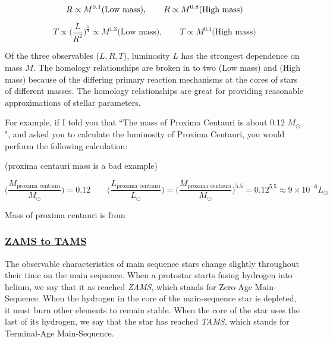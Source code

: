\documentclass[12pt]{article} %
\numberwithin{equation}{section} %
\begin{document}
\begin{equation} \label{homology_R}
R \propto M^{0.1} \text{(Low mass)}, \qquad R \propto M^{0.8} \text{(High mass)}  \\
\end{equation}

\begin{equation} \label{homology_T}
T \propto \bigg(\frac{L}{R^{2}}\bigg)^{\frac{1}{4}} \propto M^{1.3} \text{(Low mass)}, \qquad T \propto M^{0.4} \text{(High mass)} 
\end{equation}

Of the three observables ($L, R, T$), luminosity $L$ has the strongest dependence on mass $M$. The homology relationships are broken in to two (Low mass) and (High mass) because of the differing primary reaction mechanisms at the cores of stars of different masses. The homology relationships are great for providing reasonable approximations of stellar parameters. 

For example, if I told you that ``The mass of Proxima Centauri is about 0.12 $M_{\odot}$", and asked you to calculate the luminosity of Proxima Centauri, you would perform the following calculation:

(proxima centauri mass is a bad example)

\begin{equation} \label{homology_ex}
\Big( \frac{M_{\text{proxima centauri}}}{M_{\odot}} \Big) = 0.12 \qquad \Big( \frac{L_{\text{proxima centauri}}}{L_{\odot}} \Big) = \Big( \frac{M_{\text{proxima centauri}}}{M_{\odot}} \Big)^{5.5} = 0.12^{5.5} \approx 9 \times 10^{-6} L_{\odot}
\end{equation}

Mass of proxima centauri is from \citep{segransan2003first}

\subsubsection[ZAMS to TAMS]{\hyperlink{toc}{ZAMS to TAMS}} \label{sec: ZAMS to TAMS}

The observable characteristics of main sequence stars change slightly throughout their time on the main sequence. When a protostar starts fusing hydrogen into helium, we say that it as reached \emph{ZAMS}, which stands for Zero-Age Main-Sequence. When the hydrogen in the core of the main-sequence star is depleted, it must burn other elements to remain stable. When the core of the star uses the last of its hydrogen, we say that the star has reached \emph{TAMS}, which stands for Terminal-Age Main-Sequence.
\end{document}
